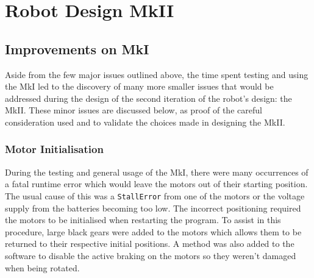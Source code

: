 \documentclass{report}
\begin{document}
    \section{Robot Design MkII}
	\subsection{Improvements on MkI}
	Aside from the few major issues outlined above, the time spent testing and using the MkI led to the discovery of many more smaller issues that would be addressed during the design of the second iteration of the robot's design: the MkII. These minor issues are discussed below, as proof of the careful consideration used and to validate the choices made in designing the MkII.
	
	\subsubsection{Motor Initialisation}
	
	During the testing and general usage of the MkI, there were many occurrences of a fatal runtime error which would leave the motors out of their starting position. The usual cause of this was a \lstinline|StallError| from one of the motors or the voltage supply from the batteries becoming too low. The incorrect positioning required the motors to be initialised when restarting the program. To assist in this procedure, large black gears were added to the motors which allows them to be returned to their respective initial positions. A method was also added to the software to disable the active braking on the motors so they weren't damaged when being rotated.
	
\end{document}
